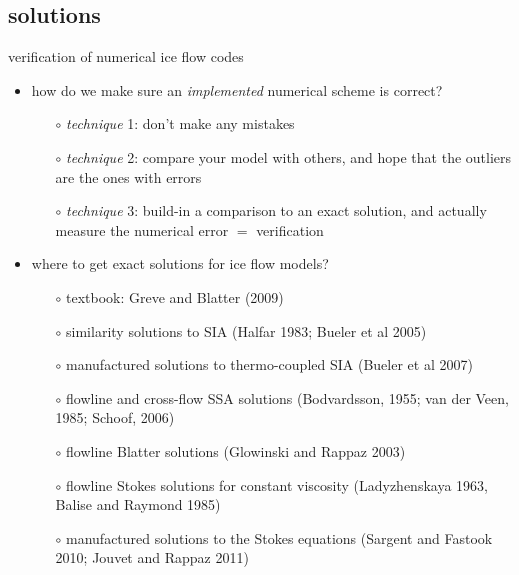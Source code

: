 \subsection{solutions}

\begin{frame}{verification of numerical ice flow codes}
\begin{itemize}
\item how do we make sure an \emph{implemented} numerical scheme is correct?
  \begin{itemize}
  \item[$\circ$] \emph{technique} 1: don't make any mistakes
  \item[$\circ$] \emph{technique} 2: compare your model with others, and hope that the outliers are the ones with errors
  \item[$\circ$] \emph{technique} 3: build-in a comparison to an exact solution, and actually measure the numerical error $=$ \alert{verification}
  \end{itemize}

\medskip
\item where to get exact solutions for ice flow models?
  \begin{itemize}
  \item[$\circ$] textbook: Greve and Blatter (2009)\nocite{GreveBlatter2009}
  \item[$\circ$] similarity solutions to SIA (Halfar 1983\nocite{Halfar83}; Bueler et al 2005\nocite{BLKCB})
  \item[$\circ$] manufactured solutions to thermo-coupled SIA (Bueler et al 2007\nocite{BBL})
  \item[$\circ$] flowline and cross-flow SSA solutions (Bodvardsson, 1955; van der Veen, 1985; Schoof, 2006)\nocite{SchoofStream,vanderVeen85}
  \item[$\circ$] flowline Blatter solutions (Glowinski and Rappaz 2003)\nocite{GlowinskiRappaz}
  \item[$\circ$] flowline Stokes solutions for constant viscosity (Ladyzhenskaya 1963\nocite{Ladyzhenskaya}, Balise and Raymond 1985\nocite{BaliseRaymond1985})
  \item[$\circ$] manufactured solutions to the Stokes equations (Sargent and Fastook 2010; Jouvet and Rappaz 2011)\nocite{JouvetRappaz2011,SargentFastook2010}
  \end{itemize}
\end{itemize}
\end{frame}


